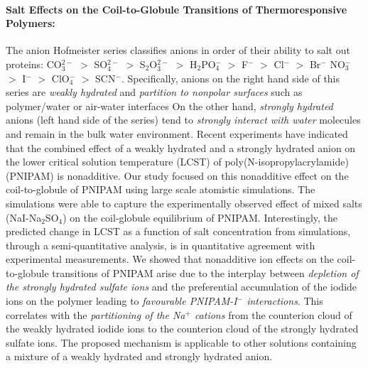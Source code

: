 \documentclass[a4paper,14pt]{article}
\begin{document}
\paragraph{\textbf{Salt Effects on the Coil-to-Globule Transitions of
Thermoresponsive Polymers:}} The anion Hofmeister series classifies anions in
order of their ability to salt out proteins: CO$_3^{2-}$ $>$ SO$_4^{2-}$ $>$
S$_2$O$_3^{2-}$ $>$ H$_2$PO$_4^{-}$ $>$ F$^{-}$ $>$ Cl$^{-}$ $>$ Br$^{-}$
NO$_3^{-}$ $>$ I$^{-}$ $>$ ClO$_4^{-}$ $>$ SCN$^{-}$.  Specifically, anions on
the right hand side of this series are \textit{weakly hydrated} and
\textit{partition to nonpolar surfaces} such as polymer/water or air-water
interfaces  On the other hand, \textit{strongly hydrated} anions (left hand
side of the series) tend to \textit{strongly interact with water} molecules and
remain in the bulk water environment. Recent experiments have indicated that
the combined effect of a weakly hydrated and a strongly hydrated anion on the
lower critical solution temperature (LCST) of
poly(N-isopropylacrylamide)(PNIPAM) is nonadditive. Our study focused on this
nonadditive effect on the coil-to-globule of PNIPAM using large scale atomistic
simulations. The simulations were able to capture the experimentally observed
effect of mixed salts (NaI-Na$_{2}$SO$_{4}$) on the coil-globule equilibrium of
PNIPAM. Interestingly, the predicted change in LCST as a function of salt
concentration from simulations, through a semi-quantitative analysis, is in
quantitative agreement with experimental measurements. We showed that
nonadditive ion effects on the coil-to-globule transitions of PNIPAM arise due
to the interplay between \textit{depletion of the strongly hydrated sulfate
ions} and the preferential accumulation of the iodide ions on the polymer
leading to \textit{favourable {\rm PNIPAM}-{\rm I}$^{-}$ interactions}. This
correlates with the \textit{partitioning of the {\rm Na}$^{+}$ cations} from
the counterion cloud of the weakly hydrated iodide ions to the counterion cloud
of the strongly hydrated sulfate ions. The proposed mechanism is applicable to
other solutions containing a mixture of a weakly hydrated and strongly hydrated
anion.
\end{document}
